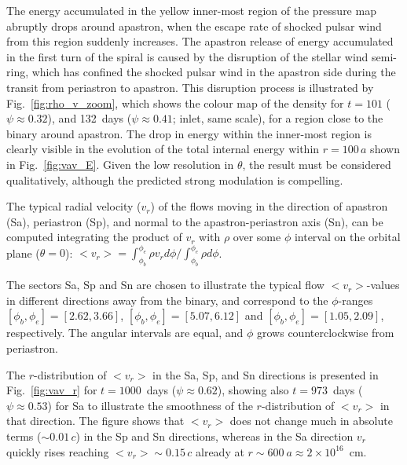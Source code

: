 \documentclass[usenatbib]{mn2e}
\begin{document}
The energy accumulated in the yellow inner-most region of the pressure map abruptly drops around apastron, when the escape rate of shocked pulsar wind from this region suddenly increases. The apastron release of energy accumulated in the first turn of the spiral is caused by the disruption of the stellar wind semi-ring, which has confined the shocked pulsar wind in the apastron side during the transit from periastron to apastron. This disruption process is illustrated by Fig.~\ref{fig:rho_v_zoom}, which shows the colour map of the density for $t=101$ ($\psi\approx 0.32$), and 132~days ($\psi\approx 0.41$; inlet, same scale), for a region close to the binary around apastron. The drop in energy within the inner-most region is clearly visible in the evolution of the total internal energy within $r=100\,a$ shown in Fig.~\ref{fig:vav_E}. Given the low resolution in $\theta$, the result must be considered qualitatively, although the predicted strong modulation is compelling.

The typical radial velocity ($v_r$) of the flows moving in the direction of apastron (Sa), periastron (Sp), and normal to the apastron-periastron axis (Sn), can be computed integrating the product of $v_r$ with $\rho$ over some $\phi$ interval on the orbital plane ($\theta=0$): $<v_r> = \int_{\phi_b}^{\phi_e}{\rho v_r d\phi} / \int_{\phi_b}^{\phi_e}{\rho d\phi}$.

The sectors Sa, Sp and Sn are chosen to illustrate the typical flow $<v_r>$-values in different directions away from the binary, and correspond to the 
$\phi$-ranges $[\phi_b,\phi_e]=[2.62,3.66]$,  $[\phi_b,\phi_e]=[5.07,6.12]$ and  $[\phi_b,\phi_e]=[1.05,2.09]$, respectively. The angular intervals are equal, and $\phi$ grows counterclockwise from periastron.

The $r$-distribution of $<v_r>$ in the Sa, Sp, and Sn directions is presented in Fig.~\ref{fig:vav_r} for $t=1000$~days ($\psi\approx 0.62$), showing also $t=973$~days ($\psi\approx 0.53$) for Sa to illustrate the smoothness of the $r$-distribution of $<v_r>$ in that direction. The figure shows that $<v_r>$ does not change much in absolute terms ($\sim 0.01\,c$) in the Sp and Sn directions, whereas in the Sa direction $v_r$ quickly rises reaching $<v_r>\sim 0.15\,c$ already at $r\sim 600~a\approx 2\times 10^{16}$~cm.
\end{document}
